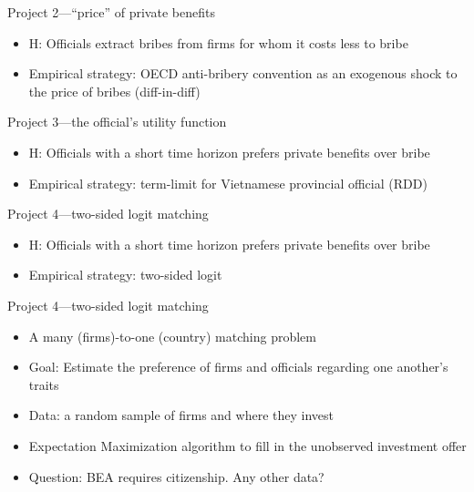 \documentclass[14pt]{beamer}
\begin{document}
\begin{frame}{Project 2---``price'' of private benefits}
\begin{itemize}
\item<1-> H: Officials extract bribes from firms for whom it costs less to bribe
\item<2-> Empirical strategy: OECD anti-bribery convention as an exogenous shock to the price of bribes (diff-in-diff)
\end{itemize}
\end{frame}

\begin{frame}{Project 3---the official's utility function}
\begin{itemize}
\item<1-> H: Officials with a short time horizon prefers private benefits over bribe
\item<2-> Empirical strategy: term-limit for Vietnamese provincial official (RDD)
\end{itemize}
\end{frame}

\begin{frame}{Project 4---two-sided logit matching}
\begin{itemize}
\item<1-> H: Officials with a short time horizon prefers private benefits over bribe
\item<2-> Empirical strategy: two-sided logit
\end{itemize}
\end{frame}

\begin{frame}{Project 4---two-sided logit matching}
\begin{itemize}[<+->]
\item A many (firms)-to-one (country) matching problem
\item Goal: Estimate the preference of firms and officials regarding one another's traits
\item Data: a random sample of firms and where they invest
\item Expectation Maximization algorithm to fill in the unobserved investment offer
\item Question: BEA requires citizenship. Any other data?
\end{itemize}
\end{frame}

\begin{frame}
\footnotesize


\end{frame}
\end{document}

